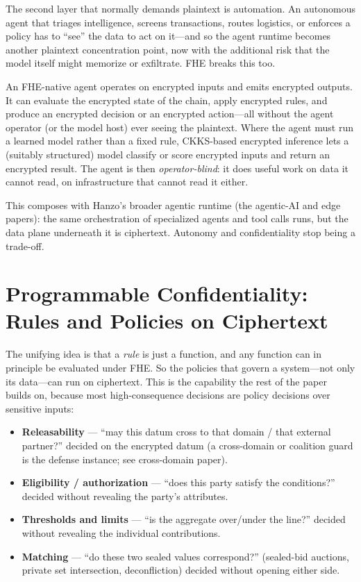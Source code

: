 \documentclass[11pt,letterpaper]{article}
\begin{document}
The second layer that normally demands plaintext is automation. An autonomous
agent that triages intelligence, screens transactions, routes logistics, or
enforces a policy has to ``see'' the data to act on it---and so the agent runtime
becomes another plaintext concentration point, now with the additional risk that
the model itself might memorize or exfiltrate. FHE breaks this too.

An FHE-native agent operates on encrypted inputs and emits encrypted outputs. It
can evaluate the encrypted state of the chain, apply encrypted rules, and produce
an encrypted decision or an encrypted action---all without the agent operator (or
the model host) ever seeing the plaintext. Where the agent must run a learned model
rather than a fixed rule, CKKS-based encrypted inference lets a (suitably
structured) model classify or score encrypted inputs and return an encrypted
result. The agent is then \emph{operator-blind}: it does useful work on data it
cannot read, on infrastructure that cannot read it either.

This composes with Hanzo's broader agentic runtime (the agentic-AI and edge papers):
the same orchestration of specialized agents and tool calls runs, but the data
plane underneath it is ciphertext. Autonomy and confidentiality stop being a
trade-off.

\section{Programmable Confidentiality: Rules and Policies on Ciphertext}

The unifying idea is that a \emph{rule} is just a function, and any function can in
principle be evaluated under FHE. So the policies that govern a system---not only
its data---can run on ciphertext. This is the capability the rest of the paper
builds on, because most high-consequence decisions are policy decisions over
sensitive inputs:

\begin{itemize}
  \item \textbf{Releasability} --- ``may this datum cross to that domain /
  that external partner?'' decided on the encrypted datum (a cross-domain or
  coalition guard is the defense instance; see cross-domain paper).
  \item \textbf{Eligibility / authorization} --- ``does this party satisfy the
  conditions?'' decided without revealing the party's attributes.
  \item \textbf{Thresholds and limits} --- ``is the aggregate over/under the line?''
  decided without revealing the individual contributions.
  \item \textbf{Matching} --- ``do these two sealed values correspond?'' (sealed-bid
  auctions, private set intersection, deconfliction) decided without opening either
  side.
\end{itemize}
\end{document}
